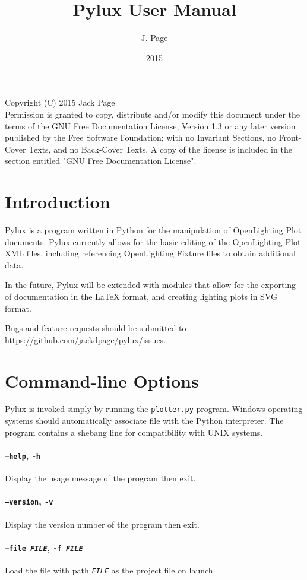 \documentclass[a4paper]{article}
\begin{document}
\title{Pylux User Manual}
\author{J. Page}
\date{2015}
\maketitle
\tableofcontents
Copyright (C)  2015 Jack Page \\
Permission is granted to copy, distribute and/or modify this document
under the terms of the GNU Free Documentation License, Version 1.3
or any later version published by the Free Software Foundation;
with no Invariant Sections, no Front-Cover Texts, and no Back-Cover Texts.
A copy of the license is included in the section entitled "GNU
Free Documentation License".
\newpage
\section{Introduction}
Pylux is a program written in Python for the manipulation of OpenLighting Plot
documents. Pylux currently allows for the basic editing of the OpenLighting
Plot XML files, including referencing OpenLighting Fixture files to obtain
additional data.

In the future, Pylux will be extended with modules that allow for the exporting
of documentation in the \LaTeX{} format, and creating lighting plots in SVG 
format.

Bugs and feature requests should be submitted to 
\url{https://github.com/jackdpage/pylux/issues}.

\section{Command-line Options}
Pylux is invoked simply by running the \texttt{plotter.py} program. Windows 
operating systems should automatically associate file with the Python 
interpreter. The program contains a shebang line for compatibility with UNIX
systems. 

\paragraph{\texttt{--help}, \texttt{-h}}
Display the usage message of the program then exit.

\paragraph{\texttt{--version}, \texttt{-v}}
Display the version number of the program then exit.

\paragraph{\texttt{--file \textit{FILE}}, \texttt{-f \textit{FILE}}} 
Load the file with path \texttt{\textit{FILE}} as the project file on launch.
\end{document}
